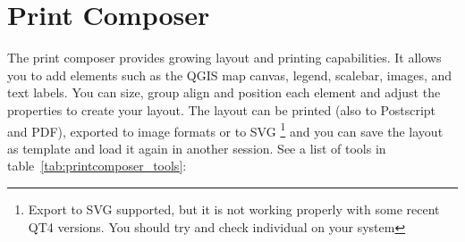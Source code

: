 
\section{Print Composer}\label{label_printcomposer}


The print composer provides growing layout and printing
capabilities. It allows you to add elements such as the QGIS map canvas, 
legend, scalebar, images, and text labels. You can size, group 
align and position each element and adjust the properties to create your
layout. The layout can be printed (also to Postscript and PDF), exported to
image formats or to SVG \footnote{Export to SVG supported, but it
is not working properly with some recent QT4 versions. You should try and
check individual on your system} and you can save the layout as template and
load it again in another session. See a list of tools in
table~\ref{tab:printcomposer_tools}:

